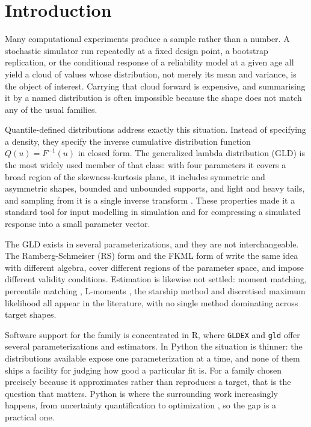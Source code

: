 \section{Introduction}\label{sec:introduction}

Many computational experiments produce a sample rather than a number. A
stochastic simulator run repeatedly at a fixed design point, a bootstrap
replication, or the conditional response of a reliability model at a given age
all yield a cloud of values whose distribution, not merely its mean and variance,
is the object of interest. Carrying that cloud forward is expensive, and
summarising it by a named distribution is often impossible because the shape does
not match any of the usual families.

Quantile-defined distributions address exactly this situation. Instead of
specifying a density, they specify the inverse cumulative distribution function
$Q(u) = F^{-1}(u)$ in closed form. The generalized lambda distribution (GLD) is
the most widely used member of that class: with four parameters it covers a broad
region of the skewness-kurtosis plane, it includes symmetric and asymmetric
shapes, bounded and unbounded supports, and light and heavy tails, and sampling
from it is a single inverse transform \parencite{RambergSchmeiser1974,
FreimerEtAl1988, KarianDudewicz2000}. These properties made it a standard tool
for input modelling in simulation and for compressing a simulated response into a
small parameter vector.

The GLD exists in several parameterizations, and they are not interchangeable.
The Ramberg-Schmeiser (RS) form \parencite{RambergSchmeiser1974} and the
FKML form of \textcite{FreimerEtAl1988} write the same idea with different
algebra, cover different regions of the parameter space, and impose different
validity conditions. Estimation is likewise not settled: moment matching,
percentile matching \parencite{KarianDudewicz1999}, L-moments
\parencite{KarvanenNuutinen2008}, the starship method
\parencite{KingMacGillivray1999} and discretised maximum likelihood
\parencite{Su2007CSDA} all appear in the literature, with no single method
dominating across target shapes.

Software support for the family is concentrated in R, where \texttt{GLDEX}
\parencite{Su2007JSS} and \texttt{gld} \parencite{KingGld} offer several
parameterizations and estimators. In Python the situation is thinner: the
distributions available expose one parameterization at a time, and none of them
ships a facility for judging how good a particular fit is. For a family chosen
precisely because it approximates rather than reproduces a target, that is the
question that matters. Python is where the surrounding work increasingly happens,
from uncertainty quantification \parencite{OlivierEtAl2020} to optimization
\parencite{BlankDeb2020}, so the gap is a practical one.

